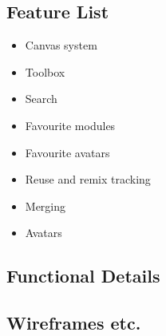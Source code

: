 \subsection{Feature List}
\begin{itemize}
\item Canvas system
\item Toolbox
\item Search
\item Favourite modules
\item Favourite avatars
\item Reuse and remix tracking
\item Merging
\item Avatars
\end{itemize}

\subsection{Functional Details}

\subsection{Wireframes etc.}
